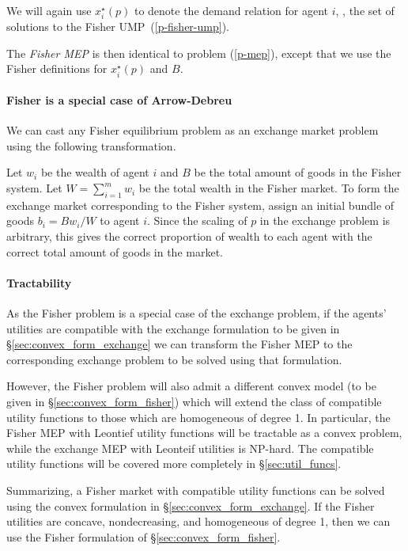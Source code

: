 \documentclass[12pt]{article}
\begin{document}
We will again use $x^\star_i(p)$ to denote the demand relation
for agent $i$, \ie, the set of solutions to the Fisher UMP~(\ref{p-fisher-ump}).

The \emph{Fisher MEP} is then identical to problem (\ref{p-mep}), except that we use 
the Fisher definitions for $x^\star_i(p)$ and $B$.


\paragraph{Fisher is a special case of Arrow-Debreu}
We can cast any Fisher equilibrium problem as an exchange market problem using the following transformation.

Let $w_i$ be the wealth of agent $i$ and $B$ be the total amount of goods in
the Fisher system.
Let $W = \sum_{i=1}^m w_i$ be the total wealth in the Fisher market.
To form the exchange market corresponding to the Fisher system, assign an initial bundle of goods
$b_i = B w_i/W$ to agent $i$.
Since the scaling of $p$ in the exchange problem is arbitrary,
this gives the correct proportion of wealth to each agent with the correct
total amount of goods in the market.


\paragraph{Tractability}
As the Fisher problem is a special case of the exchange problem,
if the agents' utilities are compatible with the exchange formulation to be given in \S\ref{sec:convex_form_exchange} we can transform the Fisher MEP
to the corresponding exchange problem to be solved using that formulation.

However, the Fisher problem will also admit a different
convex model (to be given in \S\ref{sec:convex_form_fisher})
which will extend the class of compatible utility functions
to those which are homogeneous of degree 1.
In particular, the Fisher MEP with Leontief utility functions
will be tractable as a convex problem, while the exchange MEP
with Leonteif utilities is NP-hard.
The compatible utility functions will be covered more completely
in \S\ref{sec:util_funcs}.

Summarizing, a Fisher market with compatible utility functions can be solved
using the convex formulation in \S\ref{sec:convex_form_exchange}.
If the Fisher utilities are concave, nondecreasing, and homogeneous
of degree 1, then we can use the Fisher formulation of \S\ref{sec:convex_form_fisher}.
\end{document}
